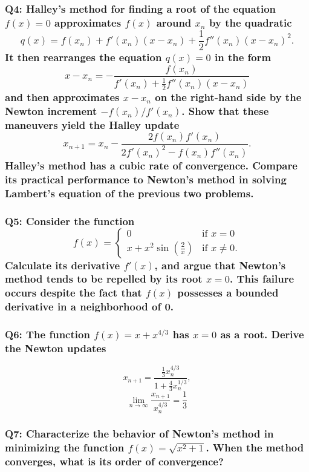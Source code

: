\documentclass{article}
\begin{document}
\subsubsection*{Q4: Halley’s method for finding a root of the equation \(f(x) = 0\) approximates \(f(x)\) around \(x_n\) by the quadratic
\[ q(x) = f(x_n) + f'(x_n)(x - x_n) + \frac{1}{2} f''(x_n)(x - x_n)^2. \]
It then rearranges the equation \(q(x) = 0\) in the form
\[ x - x_n = -\frac{f(x_n)}{f'(x_n) + \frac{1}{2} f''(x_n)(x - x_n)} \]
and then approximates \(x - x_n\) on the right-hand side by the Newton increment \(-f(x_n)/f'(x_n)\). Show that these maneuvers yield the Halley update
\[ x_{n+1} = x_n - \frac{2f(x_n)f'(x_n)}{2f'(x_n)^2 - f(x_n)f''(x_n)}. \]
Halley’s method has a cubic rate of convergence. Compare its practical performance to Newton’s method in solving Lambert’s equation of the previous two problems.}

\subsubsection*{Q5: Consider the function
\[ f(x) = \begin{cases} 
0 & \text{if } x = 0 \\
x + x^2 \sin\left(\frac{2}{x}\right) & \text{if } x \neq 0.
\end{cases} \]
Calculate its derivative \(f'(x)\), and argue that Newton’s method tends to be repelled by its root \(x = 0\). This failure occurs despite the fact that \(f(x)\) possesses a bounded derivative in a neighborhood of 0.}

\subsubsection*{Q6: The function \(f(x) = x + x^{4/3}\) has \(x = 0\) as a root. Derive the Newton updates}
\[ x_{n+1} = \frac{\frac{1}{3} x_n^{4/3}}{1 + \frac{4}{3} x_n^{1/3}}, \]
\[ \lim_{n \to \infty} \frac{x_{n+1}}{x_n^{4/3}} = \frac{1}{3} \]

\subsubsection*{Q7: Characterize the behavior of Newton’s method in minimizing the function \(f(x) = \sqrt{x^2 + 1}\). When the method converges, what is its order of convergence?}
\end{document}
